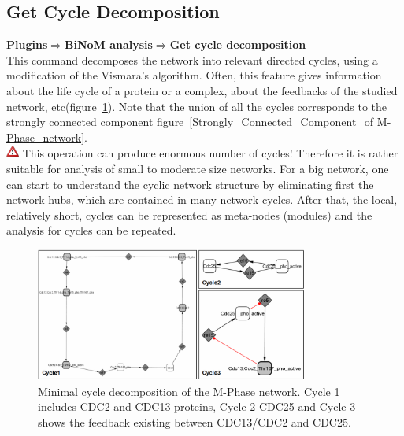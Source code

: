 \subsection{Get Cycle Decomposition}
\textbf{Plugins$\Rightarrow$BiNoM analysis$\Rightarrow$Get cycle decomposition}\\
This command decomposes the network into relevant directed cycles\cite{gleiss2001relevant}, using a modification of the Vismara’s algorithm\cite{vismara1997union}. Often, this feature gives information about the life cycle of a protein or a complex, about the feedbacks of the studied network, etc(figure~\ref{Minimal_cycle_decomposition_of_the M-Phase}). Note that the union of all the cycles corresponds to the strongly connected component figure~\ref{Strongly_Connected_Component_of M-Phase_network}.\\
\includegraphics[width=12pt,height=12pt]{graphics/warning} This operation can produce enormous number of cycles! Therefore it is rather suitable for analysis of small to moderate size networks. For a big network, one can start to understand the cyclic network structure by eliminating first the network hubs, which are contained in many network cycles. After that, the local, relatively short, cycles can be represented as meta-nodes (modules) and the analysis for cycles can be repeated.\\
\begin{figure}
\centering
\includegraphics[width=0.8\textwidth]{graphics/Minimal_cycle_decomposition_of_the_M-Phase}
\caption{Minimal cycle decomposition of the M-Phase network.  Cycle 1 includes CDC2 and CDC13 proteins, Cycle 2 CDC25 and Cycle 3 shows the feedback existing between CDC13/CDC2 and CDC25.}
\label{Minimal_cycle_decomposition_of_the M-Phase}
\end{figure}

